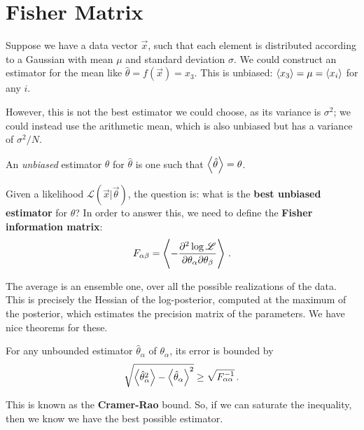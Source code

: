 \documentclass[main.tex]{subfiles}
\begin{document}
\section{Fisher Matrix}


Suppose we have a data vector \(\vec{x}\), such that each element is distributed according to a Gaussian with mean \(\mu \) and standard deviation \(\sigma \). 
We could construct an estimator for the mean like \(\hat{\theta} = f(\vec{x}) = x_3\). 
This is unbiased: \(\expval{x_3} = \mu = \expval{x_i}\) for any \(i\).

However, this is not the best estimator we could choose, as its variance is \(\sigma^2\); we could instead use the arithmetic mean, which is also unbiased but has a variance of \(\sigma^2 / N\).

An \emph{unbiased} estimator \(\theta \) for \(\hat{\theta}\) is one such that \(\expval{\hat{\theta}} = \theta \).

Given a likelihood \(\mathscr{L}(\vec{x} | \vec{\theta})\), the question is: what is the \textbf{best unbiased estimator} for \(\theta \)?
In order to answer this, we need to define the \textbf{Fisher information matrix}:
%
\begin{align}
F_{\alpha \beta } = \expval{- \pdv[2]{\log \mathscr{L}}{\theta_\alpha}{\theta _\beta }}
\,.
\end{align}

The average is an ensemble one, over all the possible realizations of the data.
This is precisely the Hessian of the log-posterior, computed at the maximum of the posterior, which estimates the precision matrix of the parameters. 
We have nice theorems for these. 

\begin{theorem}
    For any unbounded estimator \(\hat{\theta}_\alpha \) of \(\theta _\alpha \), its error is bounded by 
    \begin{align}
    \sqrt{\expval{\hat{\theta}_\alpha^2} - \expval{\hat{\theta}_\alpha }^2} \geq \sqrt{F_{\alpha \alpha }^{-1}}
    \,.
    \end{align}
\end{theorem}

This is known as the \textbf{Cramer-Rao} bound. So, if we can saturate the inequality, then we know we have the best possible estimator. 
\end{document}
